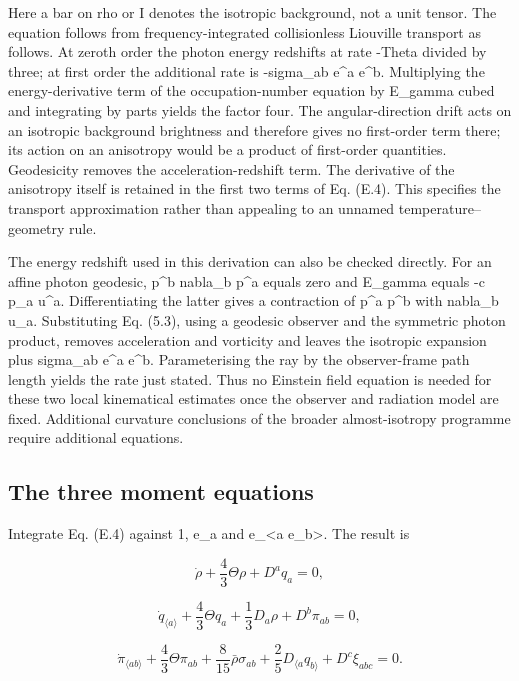 \documentclass[
  11pt,
  a4paper]{article}
\begin{document}
Here a bar on rho or I denotes the isotropic background, not a unit tensor. The equation follows from frequency-integrated collisionless Liouville transport as follows. At zeroth order the photon energy redshifts at rate -Theta divided by three; at first order the additional rate is -sigma\_ab e\^{}a e\^{}b. Multiplying the energy-derivative term of the occupation-number equation by E\_gamma cubed and integrating by parts yields the factor four. The angular-direction drift acts on an isotropic background brightness and therefore gives no first-order term there; its action on an anisotropy would be a product of first-order quantities. Geodesicity removes the acceleration-redshift term. The derivative of the anisotropy itself is retained in the first two terms of Eq. (E.4). This specifies the transport approximation rather than appealing to an unnamed temperature--geometry rule.

The energy redshift used in this derivation can also be checked directly. For an affine photon geodesic, p\^{}b nabla\_b p\^{}a equals zero and E\_gamma equals -c p\_a u\^{}a. Differentiating the latter gives a contraction of p\^{}a p\^{}b with nabla\_b u\_a. Substituting Eq. (5.3), using a geodesic observer and the symmetric photon product, removes acceleration and vorticity and leaves the isotropic expansion plus sigma\_ab e\^{}a e\^{}b. Parameterising the ray by the observer-frame path length yields the rate just stated. Thus no Einstein field equation is needed for these two local kinematical estimates once the observer and radiation model are fixed. Additional curvature conclusions of the broader almost-isotropy programme require additional equations.

\hypertarget{e.3-the-three-moment-equations}{%
\subsection{The three moment equations}\label{e.3-the-three-moment-equations}}

Integrate Eq. (E.4) against 1, e\_a and e\_\textless a e\_b\textgreater{}. The result is

\[
\dot\rho+\frac43\Theta\rho+D^a q_a=0,
\tag{E.5}
\]

\[
\dot q_{\langle a\rangle}+\frac43\Theta q_a
+\frac13D_a\rho+D^b\pi_{ab}=0,
\tag{E.6}
\]

\[
\dot\pi_{\langle ab\rangle}+\frac43\Theta\pi_{ab}
+\frac8{15}\bar\rho\sigma_{ab}
+\frac25D_{\langle a}q_{b\rangle}+D^c\xi_{abc}=0.
\tag{E.7}
\]
\end{document}
